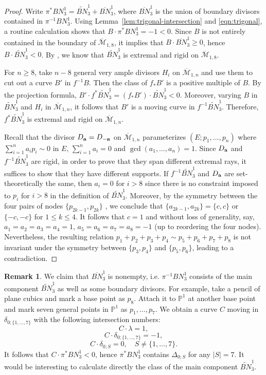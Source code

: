 \documentclass[11]{amsart}
\theoremstyle{plain}
\theoremstyle{definition}
\newtheorem{remark}[theorem]{Remark}
\newcommand{\BM}{\overline{\mathcal M}}
\newcommand{\wt}{\widetilde}
\newcommand{\bbP}{\mathbb P}
\begin{document}
\begin{proof}
Write $\pi^{*}BN^1_3 = \wt{BN}^1_3 + \overline{BN}^1_3$, where $\overline{BN}^1_3$ is the union of boundary divisors contained in $\pi^{-1}BN^1_3$. 
Using Lemma~\ref{lem:trigonal-intersection} and \eqref{eqn:trigonal}, a routine calculation shows that $B\cdot \pi^{*}BN^1_3 = -1 <  0$. Since 
$B$ is not entirely contained in the boundary of $\BM_{1,8}$, it implies that $B\cdot \overline{BN}^1_3 \geq 0$, hence 
$B\cdot  \wt{BN}^1_3 < 0$. By \cite[Lemma 4.1]{ChenCoskun}, we know that $ \wt{BN}^1_3$ is extremal and rigid on $\BM_{1,8}$. 

For $n\geq 8$, take $n-8$ general very ample divisors $H_i$ on $\BM_{1,n}$ and use them to cut out a curve $B'$ 
in $f^{-1}B$. Then the class of $f_{*}B'$ is a positive multiple of $B$. By the projection formula, 
$B' \cdot f^{*}\wt{BN}^1_3 = (f_{*}B')\cdot \wt{BN}^1_3 < 0$. 
Moreover, varying $B$ in $\wt{BN}^1_3$ and $H_i$ in $\BM_{1,n}$, it follows that $B'$ is a moving curve in 
$f^{-1}\wt{BN}^1_3$. Therefore,  $f^{*}\wt{BN}^1_3$ is extremal and rigid on $\BM_{1,n}$. 
 
Recall that the divisor $D_{\bf a} = D_{\bf -a}$ on $\BM_{1,n}$ parameterizes $(E; p_1, \ldots, p_n)$ 
where $\sum_{i=1}^n a_i p_i \sim 0$ in $E$, $\sum_{i=1}^n a_i = 0$ and $\gcd(a_1,\ldots, a_n) = 1$. 
Since $D_{\bf a}$ and $f^{-1}\wt{BN}^1_3$ are rigid, in order to prove that they span different extremal rays, it suffices to show that they have different supports. If $f^{-1}\wt{BN}^1_3$ and $D_{\bf a}$ are set-theoretically the same, then $a_i = 0$ for $ i > 8$ since there is no constraint imposed 
to $p_i$ for $i > 8$ in the definition of $\wt{BN}^1_3$. Moreover, by the symmetry between the four pairs of nodes $\{ p_{2k-1}, p_{2k}\}$ , we conclude that $\{a_{2k-1}, a_{2k}\} = \{ c, c\}$ or $\{ -c, -c\}$ for $1\leq k\leq 4$. It follows that $c = 1$ and without loss of generality, say, 
$a_1 = a_2 = a_3 = a_4 = 1$, $a_5 = a_6 = a_7 = a_8 = -1$ (up to reordering the four nodes). Nevertheless, 
the resulting relation $p_1 + p_2 + p_3 + p_4 \sim p_5 + p_6 + p_7 + p_8$ is not invariant under the symmetry between 
 $\{ p_{3}, p_{4}\}$ and $\{ p_{5}, p_{6}\}$, leading to a contradiction. 
\end{proof}

\begin{remark}
\label{rem:trigonal-component}
We claim that $\overline{BN}^1_3$ is nonempty, i.e. $\pi^{-1}BN^1_3$ consists of the main component $\wt{BN}^1_3$ as well as some boundary divisors. For example, take a pencil of plane cubics and mark a base point as $p_8$. Attach it to $\bbP^1$ at another base point 
 and mark seven general points in $\bbP^1$ as  $p_1,\ldots, p_7$. We obtain a curve $C$ moving in $\delta_{0 ; \{1,\ldots, 7 \}}$ with the following intersection numbers: 
$$ C\cdot \lambda = 1, $$
$$ C\cdot \delta_{0; \{1, \ldots, 7\}} = -1, $$
$$ C\cdot \delta_{0; S} = 0, \quad S\neq  \{1, \ldots, 7\}. $$
It follows that $C\cdot \pi^{*} BN^1_3 < 0$, hence $\pi^{*}BN^1_3$ contains 
$\Delta_{0; S}$ for any $|S| = 7$. It would be interesting to calculate directly the class of the main 
component $\wt{BN}^1_3$. 
\end{remark}
\end{document}
